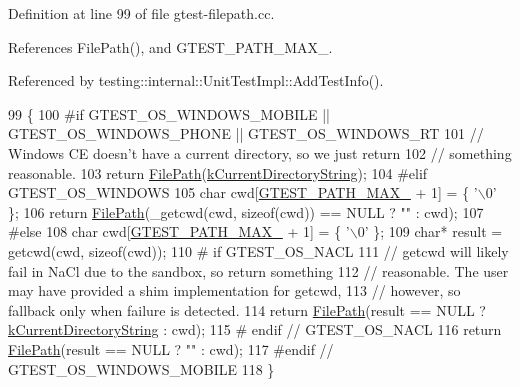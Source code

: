 Definition at line 99 of file gtest-\/filepath.\+cc.



References File\+Path(), and G\+T\+E\+S\+T\+\_\+\+P\+A\+T\+H\+\_\+\+M\+A\+X\+\_\+.



Referenced by testing\+::internal\+::\+Unit\+Test\+Impl\+::\+Add\+Test\+Info().


\begin{DoxyCode}
99                                  \{
100 \textcolor{preprocessor}{#if GTEST\_OS\_WINDOWS\_MOBILE || GTEST\_OS\_WINDOWS\_PHONE || GTEST\_OS\_WINDOWS\_RT}
101   \textcolor{comment}{// Windows CE doesn't have a current directory, so we just return}
102   \textcolor{comment}{// something reasonable.}
103   \textcolor{keywordflow}{return} \hyperlink{classtesting_1_1internal_1_1FilePath_a3504a51accbca78a52fe586133ea5499}{FilePath}(\hyperlink{namespacetesting_1_1internal_a23a8e9527d0e544e7df2d64ad549ce3e}{kCurrentDirectoryString});
104 \textcolor{preprocessor}{#elif GTEST\_OS\_WINDOWS}
105   \textcolor{keywordtype}{char} cwd[\hyperlink{gtest-filepath_8cc_ad9d445747785a9271a57cf1d392b89ad}{GTEST\_PATH\_MAX\_} + 1] = \{ \textcolor{charliteral}{'\(\backslash\)0'} \};
106   \textcolor{keywordflow}{return} \hyperlink{classtesting_1_1internal_1_1FilePath_a3504a51accbca78a52fe586133ea5499}{FilePath}(\_getcwd(cwd, \textcolor{keyword}{sizeof}(cwd)) == NULL ? \textcolor{stringliteral}{""} : cwd);
107 \textcolor{preprocessor}{#else}
108   \textcolor{keywordtype}{char} cwd[\hyperlink{gtest-filepath_8cc_ad9d445747785a9271a57cf1d392b89ad}{GTEST\_PATH\_MAX\_} + 1] = \{ \textcolor{charliteral}{'\(\backslash\)0'} \};
109   \textcolor{keywordtype}{char}* result = getcwd(cwd, \textcolor{keyword}{sizeof}(cwd));
110 \textcolor{preprocessor}{# if GTEST\_OS\_NACL}
111   \textcolor{comment}{// getcwd will likely fail in NaCl due to the sandbox, so return something}
112   \textcolor{comment}{// reasonable. The user may have provided a shim implementation for getcwd,}
113   \textcolor{comment}{// however, so fallback only when failure is detected.}
114   \textcolor{keywordflow}{return} \hyperlink{classtesting_1_1internal_1_1FilePath_a3504a51accbca78a52fe586133ea5499}{FilePath}(result == NULL ? \hyperlink{namespacetesting_1_1internal_a23a8e9527d0e544e7df2d64ad549ce3e}{kCurrentDirectoryString} : cwd);
115 \textcolor{preprocessor}{# endif  // GTEST\_OS\_NACL}
116   \textcolor{keywordflow}{return} \hyperlink{classtesting_1_1internal_1_1FilePath_a3504a51accbca78a52fe586133ea5499}{FilePath}(result == NULL ? \textcolor{stringliteral}{""} : cwd);
117 \textcolor{preprocessor}{#endif  // GTEST\_OS\_WINDOWS\_MOBILE}
118 \}
\end{DoxyCode}
